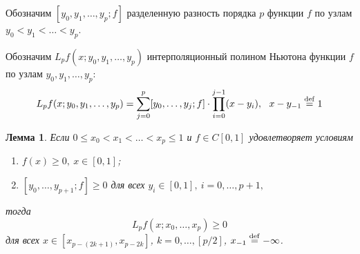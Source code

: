 \documentclass[bachelor, och, coursework, times]{SCWorks}
\newcommand{\eqdef}{\stackrel {\rm def}{=}}
\newtheorem{lem}{Лемма}
\begin{document}
Обозначим $[y_0,y_1,\ldots,y_p;f]$ разделенную разность порядка $p$ функции $f$ по узлам $y_0<y_1<\ldots<y_p$.

Обозначим $L_pf(x;y_0,y_1,\ldots,y_p)$ интерполяционный полином Ньютона функции $f$ по узлам $y_0,y_1,\ldots,y_p$:
\begin{equation} \label{eq:ex01}
    L_pf(x;y_0,y_1,\ldots,y_p)=\sum_{j=0}^p[y_0, \ldots,y_{j};f]
    \cdot \prod_{i=0}^{j-1}(x-y_i), \ \ x-y_{-1}\eqdef 1
\end{equation}

\begin{lem} \label{lem:1}
    Если $0\leqslant x_0<x_1<\ldots <x_p\leqslant 1$ и
    $f\in C[0,1]$ удовлетворяет условиям
    \begin{enumerate}
        \item
            \label{it:1lem1}$f(x)\geqslant 0, \ x\in [0,1]$;
        \item
            \label{it:2lem1}
            $[y_0,\ldots,y_{p+1};f]\geqslant 0$
            для всех $y_i \in [0,1], \
            i=0,\ldots,p+1,$
    \end{enumerate}
    тогда
    \begin{equation}\label{eq:ex02}
        L_pf(x;x_0,\ldots,x_p)\geqslant 0
    \end{equation}
    для всех $x\in [x_{p-(2k+1)},x_{p-2k}]$,
    $k=0,\ldots,\left[p/2\right]$,
    $x_{-1} \eqdef -\infty$.
\end{lem}
\end{document}
